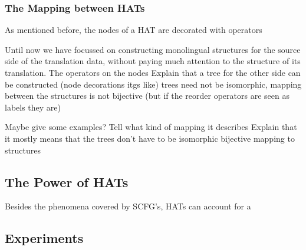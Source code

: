\documentclass{report}
\theoremstyle{definition}
\theoremstyle{plain}
\begin{document}
\subsubsection{The Mapping between HATs}

As mentioned before, the nodes of a HAT are decorated with operators

Until now we have focussed on constructing monolingual structures for the source side of the translation data, without paying much attention to the structure of its translation. The operators on the nodes 
Explain that a tree for the other side can be constructed (node decorations itgs like)
trees need not be isomorphic, mapping between the structures is not bijective (but if the reorder operators are seen as labels they are)

Maybe give some examples? Tell what kind of mapping it describes
Explain that it mostly means that the trees don't have to be isomorphic
bijective mapping to structures

\subsection{The Power of HATs}

Besides the phenomena covered by SCFG's, HATs can account for a 

\subsection{Experiments}
\end{document}

